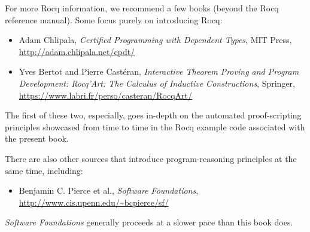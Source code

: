 \documentclass{amsbook}
\theoremstyle{definition}
\theoremstyle{remark}
\numberwithin{section}{chapter}
\numberwithin{equation}{chapter}
\begin{document}
For more Rocq information, we recommend a few books (beyond the Rocq reference manual).  Some focus purely on introducing Rocq:

\begin{itemize}
  \item Adam Chlipala, \emph{Certified Programming with Dependent Types}, MIT Press, \url{http://adam.chlipala.net/cpdt/}
  \item Yves Bertot and Pierre Cast\'eran, \emph{Interactive Theorem Proving and Program Development: Rocq'Art: The Calculus of Inductive Constructions}, Springer, \url{https://www.labri.fr/perso/casteran/RocqArt/}
\end{itemize}

The first of these two, especially, goes in-depth on the automated proof-scripting principles showcased from time to time in the Rocq example code associated with the present book.

There are also other sources that introduce program-reasoning principles at the same time, including:

\begin{itemize}
  \item Benjamin C. Pierce et al., \emph{Software Foundations}, \url{http://www.cis.upenn.edu/~bcpierce/sf/}
\end{itemize}

\emph{Software Foundations} generally proceeds at a slower pace than this book does.

\backmatter
\printindex
\end{document}

